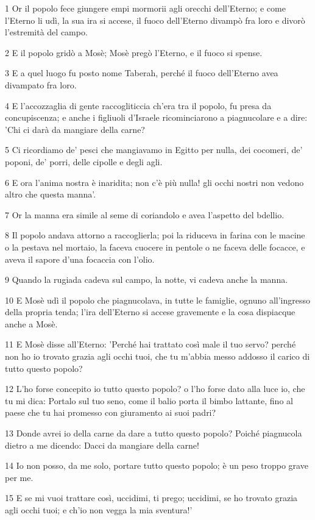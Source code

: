 \par 1 Or il popolo fece giungere empi mormorii agli orecchi dell'Eterno; e come l'Eterno li udì, la sua ira si accese, il fuoco dell'Eterno divampò fra loro e divorò l'estremità del campo.
\par 2 E il popolo gridò a Mosè; Mosè pregò l'Eterno, e il fuoco si spense.
\par 3 E a quel luogo fu posto nome Taberah, perché il fuoco dell'Eterno avea divampato fra loro.
\par 4 E l'accozzaglia di gente raccogliticcia ch'era tra il popolo, fu presa da concupiscenza; e anche i figliuoli d'Israele ricominciarono a piagnucolare e a dire: 'Chi ci darà da mangiare della carne?
\par 5 Ci ricordiamo de' pesci che mangiavamo in Egitto per nulla, dei cocomeri, de' poponi, de' porri, delle cipolle e degli agli.
\par 6 E ora l'anima nostra è inaridita; non c'è più nulla! gli occhi nostri non vedono altro che questa manna'.
\par 7 Or la manna era simile al seme di coriandolo e avea l'aspetto del bdellio.
\par 8 Il popolo andava attorno a raccoglierla; poi la riduceva in farina con le macine o la pestava nel mortaio, la faceva cuocere in pentole o ne faceva delle focacce, e aveva il sapore d'una focaccia con l'olio.
\par 9 Quando la rugiada cadeva sul campo, la notte, vi cadeva anche la manna.
\par 10 E Mosè udì il popolo che piagnucolava, in tutte le famiglie, ognuno all'ingresso della propria tenda; l'ira dell'Eterno si accese gravemente e la cosa dispiacque anche a Mosè.
\par 11 E Mosè disse all'Eterno: 'Perché hai trattato così male il tuo servo? perché non ho io trovato grazia agli occhi tuoi, che tu m'abbia messo addosso il carico di tutto questo popolo?
\par 12 L'ho forse concepito io tutto questo popolo? o l'ho forse dato alla luce io, che tu mi dica: Portalo sul tuo seno, come il balio porta il bimbo lattante, fino al paese che tu hai promesso con giuramento ai suoi padri?
\par 13 Donde avrei io della carne da dare a tutto questo popolo? Poiché piagnucola dietro a me dicendo: Dacci da mangiare della carne!
\par 14 Io non posso, da me solo, portare tutto questo popolo; è un peso troppo grave per me.
\par 15 E se mi vuoi trattare così, uccidimi, ti prego; uccidimi, se ho trovato grazia agli occhi tuoi; e ch'io non vegga la mia sventura!'
